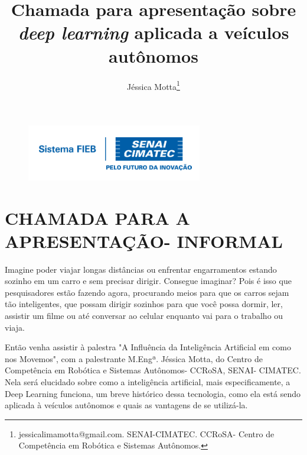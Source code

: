 \documentclass[12pt,a4paper]{article}
\begin{document}
 
\begin{figure}
    \flushright
    \includegraphics[scale=0.5]{Logo_senai.png}
\end{figure}

\title{Chamada para apresentação sobre \emph{deep learning} aplicada a veículos autônomos}
\author{Jéssica Motta\thanks{jessicalimamotta@gmail.com. SENAI-CIMATEC. CCRoSA- Centro de Competência em Robótica e Sistemas Autônomos.}}
 

    \maketitle
    \singlespacing

    
\section{CHAMADA PARA A APRESENTAÇÃO- INFORMAL}
Imagine poder viajar longas distâncias ou enfrentar engarramentos estando sozinho em um carro e sem precisar dirigir. Consegue imaginar? Pois é isso que pesquisadores estão fazendo agora, procurando meios para que os carros sejam tão inteligentes, que possam dirigir sozinhos para que você possa dormir, ler, assistir um filme ou até conversar ao celular enquanto vai para o trabalho ou viaja.

Então venha assistir à palestra "A Influência da Inteligência Artificial em como nos Movemos", com a palestrante M.Engª. Jéssica Motta, do Centro de Competência em Robótica e Sistemas Autônomos- CCRoSA, SENAI- CIMATEC. Nela será elucidado sobre como a inteligência artificial, mais especificamente, a Deep Learning funciona, um breve histórico dessa tecnologia, como ela está sendo aplicada à veículos autônomos e quais as vantagens de se utilizá-la.
\end{document}
